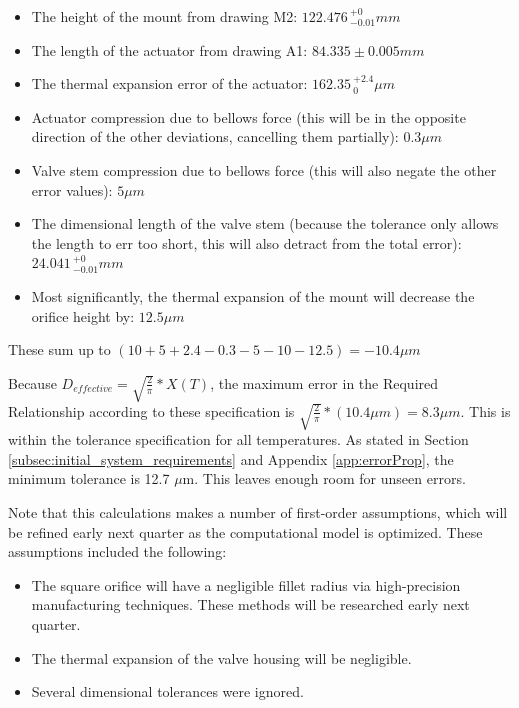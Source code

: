 \documentclass[12pt, letterpaper]{report}%
\newcounter{mycounter}           %
\newcounter{sub}[mycounter]      %
\begin{document}
        \begin{itemize}
            \item The height of the mount from drawing M2: $122.476\,{}^{+0}_{-0.01} mm$
            \item The length of the actuator from drawing A1: $84.335 \pm 0.005mm$
            \item The thermal expansion error of the actuator: $162.35\,{}^{+2.4}_{0} \mu m$
            \item Actuator compression due to bellows force (this will be in the opposite direction of the other deviations, cancelling them partially): $0.3 \mu m$
            \item Valve stem compression due to bellows force (this will also negate the other error values): $5 \mu m$
            \item The dimensional length of the valve stem (because the tolerance only allows the length to err too short, this will also detract from the total error): $24.041\,{}^{+0}_{-0.01} mm$
            \item Most significantly, the thermal expansion of the mount will decrease the orifice height by: $12.5 \mu m$
        \end{itemize}

        These sum up to 
        $(10 + 5 + 2.4 - 0.3 - 5 - 10 - 12.5) = -10.4 \mu m$

        Because $D_{effective} = \sqrt{\frac{2}{\pi}}*X(T)$, the maximum error in the Required Relationship according to these specification is
        $\sqrt{\frac{2}{\pi}}*(10.4 \mu m) = 8.3 \mu m$. This is within the tolerance specification for all temperatures.
        As stated in Section \ref{subsec:initial_system_requirements} and Appendix \ref{app:errorProp}, the minimum tolerance is 12.7 $\mu$m.
        This leaves enough room for unseen errors.

        Note that this calculations makes a number of first-order assumptions, which will be refined early next quarter as the computational model is optimized.
        These assumptions included the following:

        \begin{itemize}
            \item The square orifice will have a negligible fillet radius via high-precision manufacturing techniques. These methods will be researched early next quarter.
            \item The thermal expansion of the valve housing will be negligible.
            \item Several dimensional tolerances were ignored.
        \end{itemize}
\end{document}
